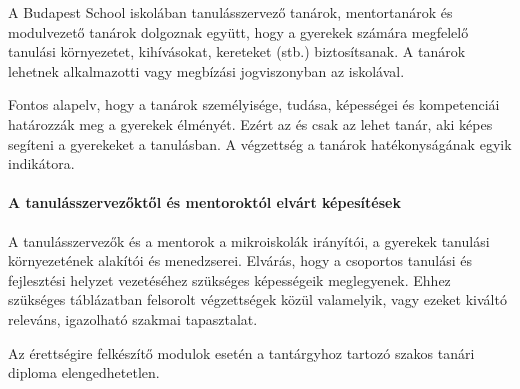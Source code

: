A Budapest School iskolában tanulásszervező tanárok, mentortanárok és modulvezető tanárok dolgoznak együtt, hogy a gyerekek számára megfelelő tanulási környezetet, kihívásokat, kereteket (stb.) biztosítsanak. A tanárok lehetnek alkalmazotti vagy megbízási jogviszonyban az iskolával.

Fontos alapelv, hogy a tanárok személyisége, tudása, képességei
és\linebreak
kompetenciái határozzák meg a gyerekek élményét.  Ezért az és csak az lehet tanár, aki képes segíteni a gyerekeket a tanulásban. A végzettség a tanárok hatékonyságának egyik indikátora.

\paragraph{A tanulásszervezőktől és mentoroktól elvárt képesítések} A
tanulásszervezők és a mentorok a mikroiskolák irányítói, a gyerekek tanulási környezetének alakítói és menedzserei. Elvárás, hogy a csoportos tanulási és fejlesztési helyzet vezetéséhez szükséges képességeik meglegyenek. Ehhez szükséges  táblázatban felsorolt végzettségek közül valamelyik, vagy ezeket kiváltó releváns, igazolható szakmai tapasztalat.

Az érettségire felkészítő modulok esetén a tantárgyhoz tartozó szakos tanári diploma elengedhetetlen.

